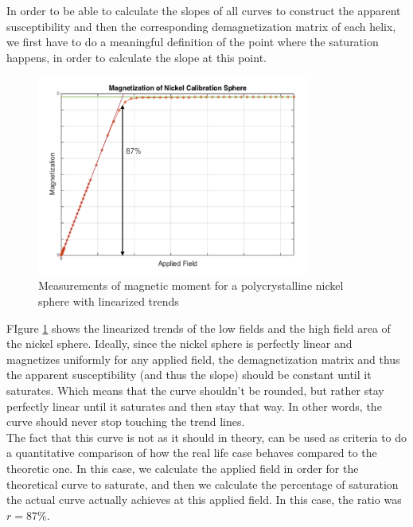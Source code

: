 In order to be able to calculate the slopes of all curves to construct the apparent susceptibility and then the corresponding demagnetization matrix of each helix, we first have to do a meaningful definition of the point where the saturation happens, in order to calculate the slope at this point.\\
    
\begin{figure}[ht]
	\centering
  \includegraphics[width=0.8\textwidth]{Pictures/NiSphere_2.png}
	\caption{Measurements of magnetic moment for a polycrystalline nickel sphere with linearized trends}
	\label{fig:NiSphere_2}
\end{figure}

FIgure \ref{fig:NiSphere_2} shows the linearized trends of the low fields and the high field area of the nickel sphere. Ideally, since the nickel sphere is perfectly linear and magnetizes uniformly for any applied field, the demagnetization matrix and thus the apparent susceptibility (and thus the slope) should be constant until it saturates. Which means that the curve shouldn't be rounded, but rather stay perfectly linear until it saturates and then stay that way. In other words, the curve should never stop touching the trend lines.\\

The fact that this curve is not as it should in theory, can be used as criteria to do a quantitative comparison of how the real life case behaves compared to the theoretic one. In this case, we calculate the applied field in order for the theoretical curve to saturate, and then we calculate the percentage of saturation the actual curve actually achieves at this applied field. In this case, the ratio was $r = 87\%$.\\

